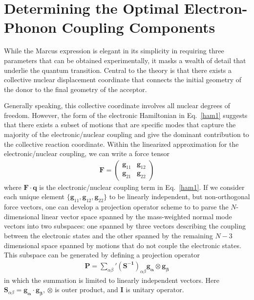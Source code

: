 \section{Determining the Optimal Electron-Phonon Coupling Components}

While the Marcus expression is elegant in its simplicity in requiring three parameters that
can be obtained experimentally, it masks a wealth of detail that underlie the quantum transition.
Central to the theory is that there exists a collective nuclear displacement coordinate
that connects the initial geometry of the donor to the final geometry of the acceptor.

Generally speaking, this collective coordinate involves all nuclear degrees of freedom.
However, the form of the electronic Hamiltonian in Eq.~\ref{ham1} suggests that
there exists a subset of motions that are specific modes  that capture the majority of the
electronic/nuclear coupling and give the dominant contribution to the collective
reaction coordinate.  Within the linearized approximation for the electronic/nuclear coupling,
we can write a force tensor
\begin{eqnarray}
{\mathbf F} =
\left(\begin{array}{cc}
{\mathbf g}_{11}&{\mathbf g}_{12} \\
{\mathbf g}_{21} &{\mathbf g}_{22}
\end{array}\right)
\end{eqnarray}
where ${\mathbf F}\cdot \mathbf q$ is the electronic/nuclear coupling term in Eq.~\ref{ham1}.
If we consider each unique element $\{ \mathbf g_{11}, \mathbf g_{12} , \mathbf g_{22}\}$ to be
linearly independent, but non-orthogonal force vectors,  one can develop a  projection operator scheme to
to parse the $N$-dimensional linear vector space spanned by the mass-weighted normal mode vectors into two subspaces:
one spanned by three vectors describing the coupling between the electronic states
and the other spanned by the remaining $N-3$ dimensional space spanned by motions that
do not couple the electronic states.
This  subspace  can be generated by defining a projection operator
\begin{eqnarray}
\mathbf{P}=\sum_{\alpha\beta}'\left(\mathbf{S^{-1}}\right)_{\alpha\beta}\mathbf{g_{\alpha}}\otimes\mathbf{g_{\beta}}
\end{eqnarray}
in which the summation is limited to linearly independent vectors.
   Here $\mathbf{S}_{\alpha\beta}=\mathbf{g_{\alpha}}\cdot\mathbf{g_{\beta}}$,
$\otimes$ is outer product,  and $\mathbf{I}$ is unitary operator.
